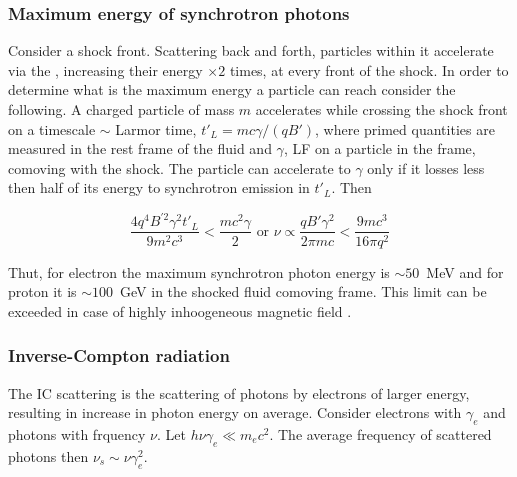 

\subsubsection{Maximum energy of synchrotron photons}

Consider a shock front. Scattering back and forth, particles within it accelerate via the , increasing their energy $\times 2$ times, at every front of the shock.
In order to determine what is the maximum energy a particle can reach consider the following. A charged particle of mass $m$ accelerates while crossing the shock front on a timescale $\sim$ Larmor time, $t'_L = mc\gamma/(qB')$, where primed quantities are measured in the rest frame of the fluid and $\gamma$, \ac{LF} on a particle in the frame, comoving with the shock. 
The particle can accelerate to $\gamma$ only if it losses less then half of its energy to synchrotron emission in $t'_L$. Then 

\begin{equation}
\frac{4 q^4 B^{'2}\gamma^2 t'_L}{9 m^2 c^3} < \frac{m c^2\gamma}{2} \text{ or } \nu\propto \frac{q B' \gamma^2}{2\pi m c} < \frac{9 m c^3}{16\pi q^2}
\end{equation}

Thut, for electron the maximum synchrotron photon energy is $\sim 50$~MeV and for proton it is $\sim 100$~GeV in the shocked fluid comoving frame. 
This limit can be exceeded in case of highly inhoogeneous magnetic field \citep{Kumar:2012}.


\subsubsection{Inverse-Compton radiation}

The \ac{IC} scattering is the scattering of photons by electrons of larger energy, resulting in increase in photon energy on average.
Consider electrons with $\gamma_e$ and photons with frquency $\nu$. Let $h\nu\gamma_e \ll m_e c^2$. The average frequency of scattered photons then $\nu_s\sim\nu\gamma^2_e$.

